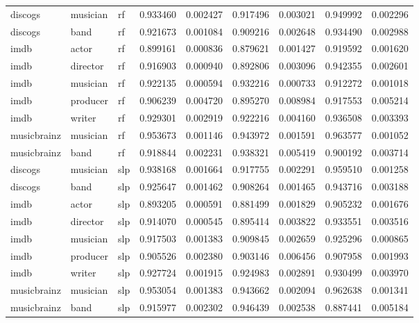 \documentclass[epsfig,a4paper,11pt,titlepage,twoside,openany]{book}
\begin{document}
\begin{longtable}{|l|l|l|l|l|l|l|l|l|}
discogs     & musician & rf    & 0.933460 & 0.002427 & 0.917496  & 0.003021 & 0.949992 & 0.002296 \\
discogs     & band     & rf    & 0.921673 & 0.001084 & 0.909216  & 0.002648 & 0.934490 & 0.002988 \\
imdb        & actor    & rf    & 0.899161 & 0.000836 & 0.879621  & 0.001427 & 0.919592 & 0.001620 \\
imdb        & director & rf    & 0.916903 & 0.000940 & 0.892806  & 0.003096 & 0.942355 & 0.002601 \\
imdb        & musician & rf    & 0.922135 & 0.000594 & 0.932216  & 0.000733 & 0.912272 & 0.001018 \\
imdb        & producer & rf    & 0.906239 & 0.004720 & 0.895270  & 0.008984 & 0.917553 & 0.005214 \\
imdb        & writer   & rf    & 0.929301 & 0.002919 & 0.922216  & 0.004160 & 0.936508 & 0.003393 \\
musicbrainz & musician & rf    & 0.953673 & 0.001146 & 0.943972  & 0.001591 & 0.963577 & 0.001052 \\ 
musicbrainz & band     & rf    & 0.918844 & 0.002231 & 0.938321  & 0.005419 & 0.900192 & 0.003714 \\ \hline
discogs     & musician & slp   & 0.938168 & 0.001664 & 0.917755  & 0.002291 & 0.959510 & 0.001258 \\
discogs     & band     & slp   & 0.925647 & 0.001462 & 0.908264  & 0.001465 & 0.943716 & 0.003188 \\
imdb        & actor    & slp   & 0.893205 & 0.000591 & 0.881499  & 0.001829 & 0.905232 & 0.001676 \\
imdb        & director & slp   & 0.914070 & 0.000545 & 0.895414  & 0.003822 & 0.933551 & 0.003516 \\
imdb        & musician & slp   & 0.917503 & 0.001383 & 0.909845  & 0.002659 & 0.925296 & 0.000865 \\
imdb        & producer & slp   & 0.905526 & 0.002380 & 0.903146  & 0.006456 & 0.907958 & 0.001993 \\
imdb        & writer   & slp   & 0.927724 & 0.001915 & 0.924983  & 0.002891 & 0.930499 & 0.003970 \\
musicbrainz & musician & slp   & 0.953054 & 0.001383 & 0.943662  & 0.002094 & 0.962638 & 0.001341 \\
musicbrainz & band     & slp   & 0.915977 & 0.002302 & 0.946439  & 0.002538 & 0.887441 & 0.005184 \\ \hline
\end{longtable}
\end{document}
